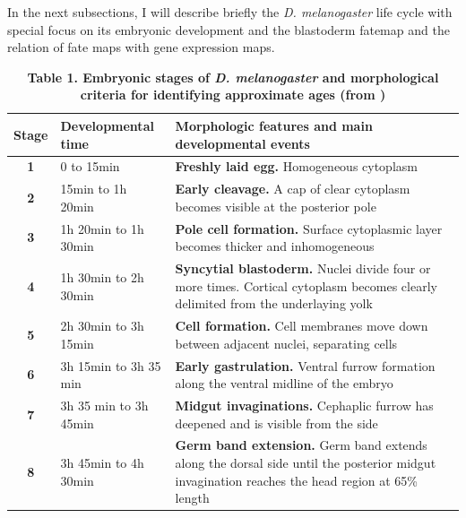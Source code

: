 In the next subsections, I will describe briefly the \textit{D. melanogaster} life cycle with special focus on its embryonic development and the blastoderm fatemap and the relation of fate maps with gene expression maps.
\label{Table_droso}
\begin{table}
    \centering
\caption*{\textbf{Table 1. Embryonic stages of \textit{D. melanogaster} and morphological criteria for identifying approximate ages (from \citealp{Roberts1998}) }}
\begin{tabular}{|c|p{3.5cm}|p{14cm}|}
\hline
\textbf{Stage}&\textbf{Developmental time}&\textbf{Morphologic features and main developmental events}\\
\hline
\textbf{1}	& 0 to 15min	& \textbf{Freshly laid egg.} Homogeneous cytoplasm	\\
%
\textbf{2}	& 15min to 1h 20min	&  \textbf{Early cleavage.} A cap of clear cytoplasm becomes visible at the posterior pole 	\\  
%
\textbf{3}	& 1h 20min to 1h 30min	&  \textbf{Pole cell formation.} Surface cytoplasmic layer becomes thicker and inhomogeneous	\\  
%
\textbf{4}	& 1h 30min to 2h 30min & \textbf{Syncytial blastoderm.} Nuclei divide four or more times. Cortical cytoplasm  becomes clearly delimited	from the underlaying yolk\\
%
\textbf{5}	& 2h 30min to 3h 15min	& \textbf{Cell formation.} Cell membranes move down between adjacent nuclei, separating cells	\\
%
\textbf{6}	& 3h 15min to 3h 35 min	&  \textbf{Early gastrulation.} Ventral furrow formation along the ventral midline of the embryo \\
%
\textbf{7}	& 3h 35 min to 3h 45min	&  \textbf{Midgut invaginations.} Cephaplic furrow has deepened and is visible from the side	\\
%
\textbf{8}	& 3h 45min to 4h 30min	&  \textbf{Germ band extension.} Germ band extends along the dorsal side until the posterior midgut invagination reaches the head region at 65\% length	\\

\end{tabular}
\end{table}
